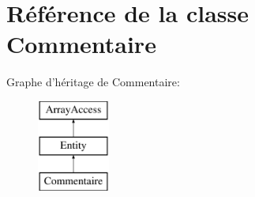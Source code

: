 \hypertarget{class_library_1_1_entities_1_1_commentaire}{\section{Référence de la classe Commentaire}
\label{class_library_1_1_entities_1_1_commentaire}
}
Graphe d'héritage de Commentaire\+:\begin{figure}[H]
\begin{center}
\leavevmode
\includegraphics[height=3.000000cm]{class_library_1_1_entities_1_1_commentaire}
\end{center}
\end{figure}
